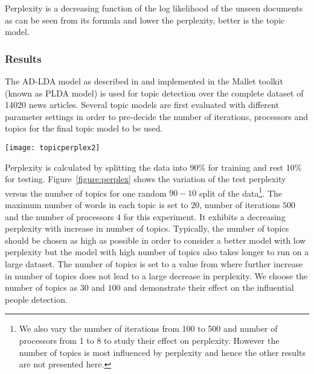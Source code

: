 Perplexity is a decreasing function of the log likelihood of the unseen documents as can be seen from its formula and lower the perplexity, better is the topic model.

\subsubsection{Results}
\label{topic detection:result}

The AD-LDA model as described in \cite{newman2009distributed} and implemented in the Mallet\cite{McCallumMALLET} toolkit (known as PLDA model) is used for topic detection over the complete dataset of 14020 news articles. 
Several topic models are first evaluated with different parameter settings in order to pre-decide the number of iterations, processors and topics for the final topic model to be used.



\begin{figure*}
\begin{center}
\texttt{[image: topicperplex2]}
\caption{Test Set Perplexity versus Number of Topics for a random $90-10$ split of the data. The maximum number of words in each topic is $20$, number of iterations $500$ and the number of processors $4$ for this experiment.}
\label{figure:perplex}
\end{center}
\end{figure*}

Perplexity is calculated by splitting the data into 90\% for training and rest 10\% for testing. 
Figure~\ref{figure:perplex} shows the variation of the test perplexity versus the number of topics for one random $90-10$ split of the data\footnote{We also vary the number of iterations from 100 to 500 and number of processors from 1 to 8 to study their effect on perplexity. However the number of topics is most influenced by perplexity and hence the other results are not presented here.}. The maximum number of words in each topic is set to $20$, number of iterations $500$ and the number of processors $4$ for this experiment. It exhibits a decreasing perplexity with increase in number of topics. Typically, the number of topics should be chosen as high as possible in order to consider a better model with low perplexity but the model with high number of topics also takes longer to run on a large dataset. The number of topics is set to a value from where further increase in number of topics does not lead to a large decrease in perplexity. We choose the number of topics as $30$ and $100$ and demonstrate their effect on the influential people detection.

